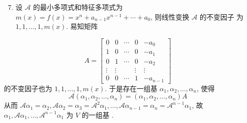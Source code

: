 \documentclass[10pt]{article}
\begin{document}
\begin{enumerate}
  \setcounter{enumi}{6}
  \item  设  $\mathcal{A}$  的最小多项式和特征多项式为  $m(x)=f(x)=x^{n}+a_{n-1} x^{n-1}+\cdots+a_{0}$,  则线性变换  $\mathcal{A}$  的不变因子   为  $1,1, \ldots, 1, m(x)$.  易知矩阵 
\end{enumerate}
$$
A=\left[\begin{array}{ccccc}
0 & 0 & \cdots & 0 & -a_{0} \\
1 & 0 & \cdots & 0 & -a_{1} \\
0 & 1 & \cdots & 0 & -a_{2} \\
\vdots & \vdots & & \vdots & \vdots \\
0 & 0 & \cdots & 1 & -a_{n-1}
\end{array}\right]
$$
 的不变因子也为  $1,1, \ldots, 1, m(x)$.  于是存在一组基  $\alpha_{1}, \alpha_{2}, \ldots, \alpha_{n}$,  使得 
$$
\mathcal{A}\left(\alpha_{1}, \alpha_{2}, \ldots, \alpha_{n}\right)=\left(\alpha_{1}, \alpha_{2}, \ldots, \alpha_{n}\right) A
$$
 从而  $\mathcal{A} \alpha_{1}=\alpha_{2}, \mathcal{A} \alpha_{2}=\alpha_{3}=\mathcal{A}^{2} \alpha_{1}, \ldots, \mathcal{A} \alpha_{n-1}=\alpha_{n}=\mathcal{A}^{n-1} \alpha_{1}$,  故  $\alpha_{1}, \mathcal{A} \alpha_{1}, \ldots, \mathcal{A}^{n-1} \alpha_{1}$  为  $V$  的一组基 .
\end{document}
